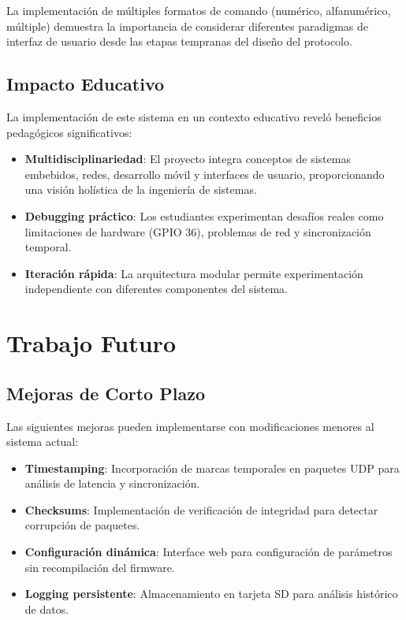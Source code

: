 \documentclass[conference,a4paper]{IEEEtran}
\begin{document}
La implementación de múltiples formatos de comando (numérico, alfanumérico, múltiple) demuestra la importancia de considerar diferentes paradigmas de interfaz de usuario desde las etapas tempranas del diseño del protocolo.

\subsection{Impacto Educativo}

La implementación de este sistema en un contexto educativo reveló beneficios pedagógicos significativos:

\begin{itemize}
    \item \textbf{Multidisciplinariedad}: El proyecto integra conceptos de sistemas embebidos, redes, desarrollo móvil y interfaces de usuario, proporcionando una visión holística de la ingeniería de sistemas.
    \item \textbf{Debugging práctico}: Los estudiantes experimentan desafíos reales como limitaciones de hardware (GPIO 36), problemas de red y sincronización temporal.
    \item \textbf{Iteración rápida}: La arquitectura modular permite experimentación independiente con diferentes componentes del sistema.
\end{itemize}

\section{Trabajo Futuro}

\subsection{Mejoras de Corto Plazo}

Las siguientes mejoras pueden implementarse con modificaciones menores al sistema actual:

\begin{itemize}
    \item \textbf{Timestamping}: Incorporación de marcas temporales en paquetes UDP para análisis de latencia y sincronización.
    \item \textbf{Checksums}: Implementación de verificación de integridad para detectar corrupción de paquetes.
    \item \textbf{Configuración dinámica}: Interface web para configuración de parámetros sin recompilación del firmware.
    \item \textbf{Logging persistente}: Almacenamiento en tarjeta SD para análisis histórico de datos.
\end{itemize}
\end{document}
